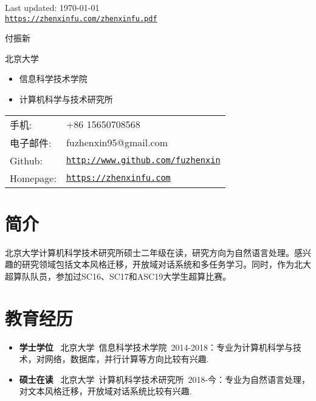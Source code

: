 \documentclass[letterpaper]{article}
\def\footerlink{https://zhenxinfu.com/zhenxinfu.pdf}
\begin{document}
\bigskip


\begin{center}
  \begin{footnotesize}
    Last updated: \today \\
    \href{\footerlink}{\texttt{\footerlink}}
  \end{footnotesize}
\end{center}

\clearpage


{\huge 付振新}


\vspace{0.25in}

\begin{minipage}{0.45\linewidth}
  \begin{large}北京大学\end{large}
  \begin{itemize}
    \itemsep=-0.02in
      \item 信息科学技术学院
      \item 计算机科学与技术研究所
  \end{itemize}
  
\end{minipage}
\begin{minipage}{0.45\linewidth}
  \begin{tabular}{ll}
    手机: & +86 15650708568 \\
    电子邮件: & fuzhenxin95@gmail.com \\
    Github: & \href{https://www.github.com/fuzhenxin}{\tt http://www.github.com/fuzhenxin} \\
    Homepage: & \href{http://zhenxinfu.com}{\tt https://zhenxinfu.com} \\
  \end{tabular}
\end{minipage}


\section*{简介}
北京大学计算机科学技术研究所硕士二年级在读，研究方向为自然语言处理。感兴趣的研究领域包括文本风格迁移，开放域对话系统和多任务学习。同时，作为北大超算队队员，参加过SC16、SC17和ASC19大学生超算比赛。


\section*{教育经历}
\begin{itemize}
  \item \textbf{学士学位} ~北京大学~信息科学技术学院~2014-2018：专业为计算机科学与技术，对网络，数据库，并行计算等方向比较有兴趣.
  \item \textbf{硕士在读} ~北京大学~计算机科学技术研究所~2018-今：专业为自然语言处理，对文本风格迁移，开放域对话系统比较有兴趣.
\end{itemize}
\end{document}
